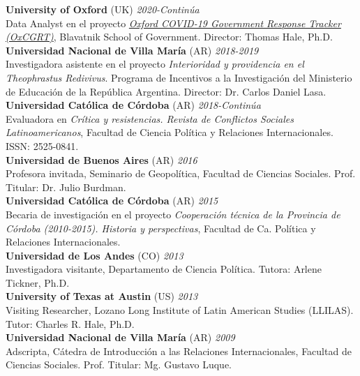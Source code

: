 \documentclass[12pt]{article}
\begin{document}
\begin{rSection}

{\bf University of Oxford} (UK) \hfill {\em 2020-Continúa} \\ 
Data Analyst en el proyecto \href{https://www.bsg.ox.ac.uk/research/research-projects/oxford-covid-19-government-response-tracker}{\em Oxford COVID-19 Government Response Tracker (OxCGRT)}, Blavatnik School of Government. Director: Thomas Hale, Ph.D.\\

{\bf Universidad Nacional de Villa María} (AR) \hfill {\em 2018-2019} \\ 
Investigadora asistente en el proyecto {\em Interioridad y providencia en el Theophrastus Redivivus}. Programa de Incentivos a la Investigación del Ministerio de Educación de la República Argentina. Director: Dr. Carlos Daniel Lasa.\\

{\bf Universidad Católica de Córdoba} (AR) \hfill {\em 2018-Continúa} \\ 
Evaluadora en {\em Crítica y resistencias. Revista de Conflictos Sociales Latinoamericanos}, Facultad de Ciencia Política y Relaciones Internacionales. ISSN: 2525-0841.\\

{\bf Universidad de Buenos Aires} (AR) \hfill {\em 2016} \\ 
Profesora invitada, Seminario de Geopolítica, Facultad de Ciencias Sociales. Prof. Titular: Dr. Julio Burdman.\\

{\bf Universidad Católica de Córdoba} (AR) \hfill {\em 2015} \\ 
Becaria de investigación en el proyecto {\em Cooperación técnica de la Provincia de Córdoba (2010-2015). Historia y perspectivas}, Facultad de Ca. Política y Relaciones Internacionales. \\

{\bf Universidad de Los Andes} (CO) \hfill {\em 2013} \\ 
Investigadora visitante, Departamento de Ciencia Política. Tutora: Arlene Tickner, Ph.D. \\

{\bf University of Texas at Austin} (US) \hfill {\em 2013} \\ 
Visiting Researcher, Lozano Long Institute of Latin American Studies (LLILAS). Tutor: Charles R. Hale, Ph.D. \\

{\bf Universidad Nacional de Villa María} (AR) \hfill {\em 2009} \\ 
Adscripta, Cátedra de Introducción a las Relaciones Internacionales, Facultad de Ciencias Sociales. Prof. Titular: Mg. Gustavo Luque.\\


\end{rSection}
\end{document}
